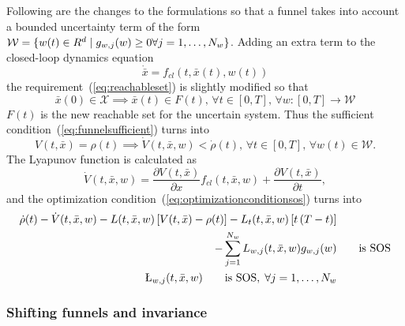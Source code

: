 Following are the changes to the formulations so that a funnel takes into
account a bounded uncertainty term of the form \(\mathcal{W} = \lbrace w(t) \in
  R^d \mid g_{w,j}(w) \geq 0 \forall j = 1,\ldots,N_w\rbrace\). Adding an extra term
to the closed-loop dynamics equation
\[
  \dot{\bar{x}} = f_{cl}(t, \bar{x}(t), w(t))
\]
the requirement~(\ref{eq:reachableset}) is slightly modified so that
\begin{equation}
  \label{eq:uncertain-reachableset}
  \bar{x}(0) \in \mathcal{X} \implies \bar{x}(t) \in F(t),\, \forall t \in
  [0,T], \, \forall w \colon [0,T] \rightarrow \mathcal{W}
\end{equation} 
\(F(t)\) is the new reachable set for the uncertain system. Thus the sufficient
condition~(\ref{eq:funnelsufficient}) turns into
\begin{equation}
  \label{eq:funneluncertain-sufficient}
  V(t,\bar{x}) = \rho(t) \implies \dot{V}(t,\bar{x},w) < \dot{\rho}(t), \, \forall t \in [0,T], \, \forall w(t) \in \mathcal{W}.
\end{equation}
The Lyapunov function is calculated as
\begin{equation}
  \dot{V}(t,\bar{x}, w) = \frac{\partial V(t,\bar{x})}{\partial x} f_{cl}(t,\bar{x},w) + \frac{\partial V(t,\bar{x})}{\partial t},
\end{equation}
and the optimization condition~(\ref{eq:optimizationconditionsos}) turns into
\begin{align}
  \label{eq:optimizationconditionuncertain}
  \dot{\rho}(t) - \dot{V}(t,\bar{x},w) - L(t,\bar{x},w) \left[ V(t,\bar{x}) - \rho(t) \right] - L_{t}(t,\bar{x},w)\left[ t\left( T - t \right) \right]  & \\
  - \sum_{j=1}^{N_{w}} L_{w,j}(t,\bar{x},w)g_{w,j}(w)& \qquad \text{is SOS}  \\
  \L_{w,j}(t,\bar{x},w) \qquad \text{is SOS}, \; \forall j = 1,\ldots,N_w
\end{align}

\subsubsection{Shifting funnels and invariance}

